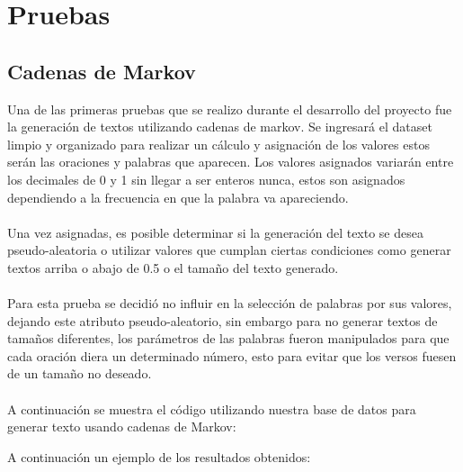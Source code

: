 \documentclass[12pt, a4paper, titlepage]{report}
\begin{document}
	   	\section{Pruebas}
	   	
	   	\subsection{Cadenas de Markov}
	   	Una de las primeras pruebas que se realizo durante el desarrollo del proyecto fue la generación de textos utilizando cadenas de markov.
	   	Se ingresará el dataset limpio y organizado para realizar un cálculo y asignación de los valores estos serán las oraciones y palabras que aparecen.
	   	Los valores asignados variarán entre los decimales de 0 y 1 sin llegar a ser enteros nunca, estos son asignados dependiendo a la frecuencia en que la palabra va apareciendo.\\\\
	   	Una vez asignadas, es posible determinar si la generación del texto se desea pseudo-aleatoria o utilizar valores que cumplan ciertas condiciones como generar textos arriba o abajo de 0.5 o el tamaño del texto generado.\\\\
	   	Para esta prueba se decidió no influir en la selección de palabras por sus valores, dejando este atributo pseudo-aleatorio, sin embargo para no generar textos de tamaños diferentes, los parámetros de las palabras fueron manipulados para que cada oración diera un determinado número, esto para evitar que los versos fuesen de un tamaño no deseado.\\\\
	   	A continuación se muestra el código utilizando nuestra base de datos para generar texto usando cadenas de Markov:
	   	\begin{center}
	   		
	   	\end{center}
   	\newpage
	   	A continuación un ejemplo de los resultados obtenidos:
	   	\begin{center}
	   				
	   	\end{center}
   	
\end{document}
